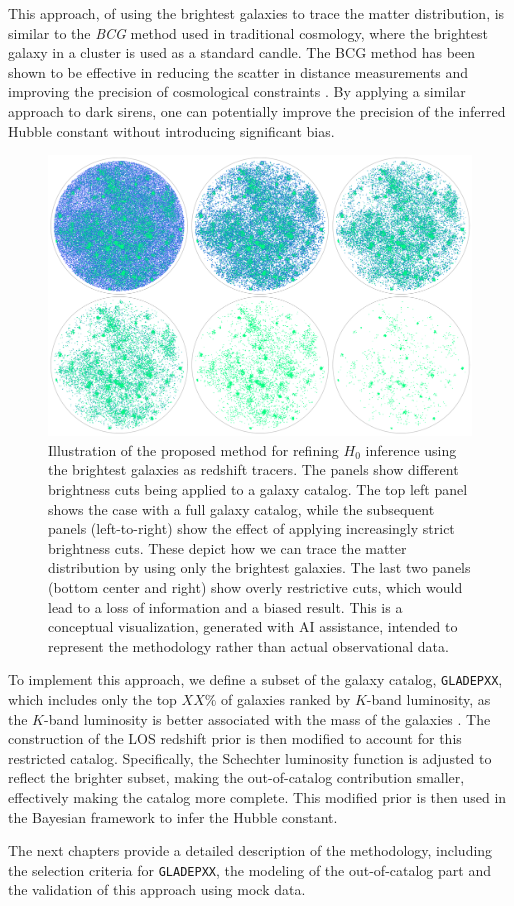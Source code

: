 This approach, of using the brightest galaxies to trace the matter distribution, is similar to the \textit{\ac{BCG}} method used in traditional cosmology, where the brightest galaxy in a cluster is used as a standard candle. The \ac{BCG} method has been shown to be effective in reducing the scatter in distance measurements and improving the precision of cosmological constraints \citep{lauer2014brightest}. By applying a similar approach to dark sirens, one can potentially improve the precision of the inferred Hubble constant without introducing significant bias.


\begin{figure}[h!]
    \centering
    \includegraphics[width=\textwidth]{figures/depict5.png}
    \caption[Illustration of the proposed method, using bright galaxies as redshift tracers.]{Illustration of the proposed method for refining $H_0$ inference using the brightest galaxies as redshift tracers. The panels show different brightness cuts being applied to a galaxy catalog. The top left panel shows the case with a full galaxy catalog, while the subsequent panels (left-to-right) show the effect of applying increasingly strict brightness cuts. These depict how we can trace the matter distribution by using only the brightest galaxies. The last two panels (bottom center and right) show overly restrictive cuts, which would lead to a loss of information and a biased result. This is a conceptual visualization, generated with AI assistance, intended to represent the methodology rather than actual observational data.}
    \label{fig:depict}
\end{figure}

To implement this approach, we define a subset of the galaxy catalog, \texttt{GLADEPXX}, which includes only the top $XX\%$ of galaxies ranked by $K$-band luminosity, as the $K$-band luminosity is better associated with the mass of the galaxies \citep{strazzullo2006near,sureshkumar2021galaxy}. The construction of the LOS redshift prior is then modified to account for this restricted catalog. Specifically, the Schechter luminosity function is adjusted to reflect the brighter subset, making the out-of-catalog contribution smaller, effectively making the catalog more complete. This modified prior is then used in the Bayesian framework to infer the Hubble constant.

The next chapters provide a detailed description of the methodology, including the selection criteria for \texttt{GLADEPXX}, the modeling of the out-of-catalog part and the validation of this approach using mock data.
